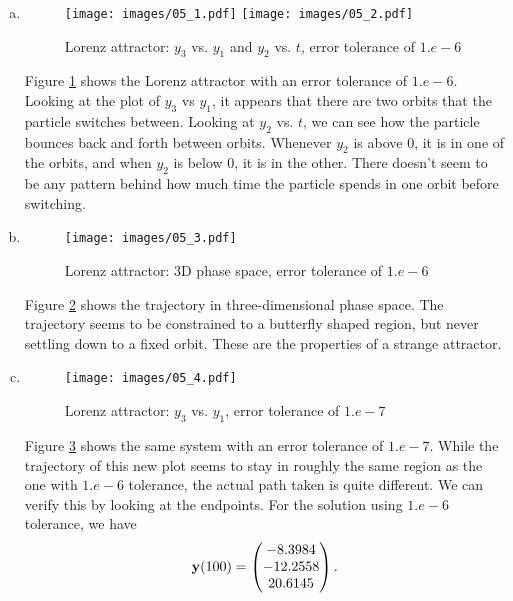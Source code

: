 \begin{solution}
  \begin{enumerate}[(a)]
    \item 
    \begin{figure}[h!]
      \centering
      \texttt{[image: images/05\_1.pdf]}
      \texttt{[image: images/05\_2.pdf]}
      \caption{Lorenz attractor: $y_3$ vs. $y_1$ and $y_2$ vs. $t$, error tolerance of $1.e-6$}
      \label{F:05_1}
    \end{figure}
      Figure \ref{F:05_1} shows the Lorenz attractor with an error tolerance of $1.e-6$. Looking at the plot of $y_3$ vs $y_1$, it appears that there are two orbits that the particle switches between. Looking at $y_2$ vs. $t$, we can see how the particle bounces back and forth between orbits. Whenever $y_2$ is above 0, it is in one of the orbits, and when $y_2$ is below 0, it is in the other. There doesn't seem to be any pattern behind how much time the particle spends in one orbit before switching.
    \item
    \begin{figure}[h!]
      \centering
      \texttt{[image: images/05\_3.pdf]}
      \caption{Lorenz attractor: 3D phase space, error tolerance of $1.e-6$}
      \label{F:05_2}
    \end{figure}
    Figure \ref{F:05_2} shows the trajectory in three-dimensional phase space. The trajectory seems to be constrained to a butterfly shaped region, but never settling down to a fixed orbit. These are the properties of a strange attractor.
    \newpage
    \item
    \begin{figure}[h!]
      \centering
      \texttt{[image: images/05\_4.pdf]}
      \caption{Lorenz attractor: $y_3$ vs. $y_1$, error tolerance of $1.e-7$}
      \label{F:05_3}
    \end{figure}
    Figure \ref{F:05_3} shows the same system with an error tolerance of $1.e-7$. While the trajectory of this new plot seems to stay in roughly the same region as the one with $1.e-6$ tolerance, the actual path taken is quite different. We can verify this by looking at the endpoints. For the solution using $1.e-6$ tolerance, we have
    \[
      \mathbf{y}(100) = 
      \begin{pmatrix}
        -8.3984 \\
        -12.2558 \\
        20.6145
      \end{pmatrix}.
\]
\end{enumerate}
\end{solution}
